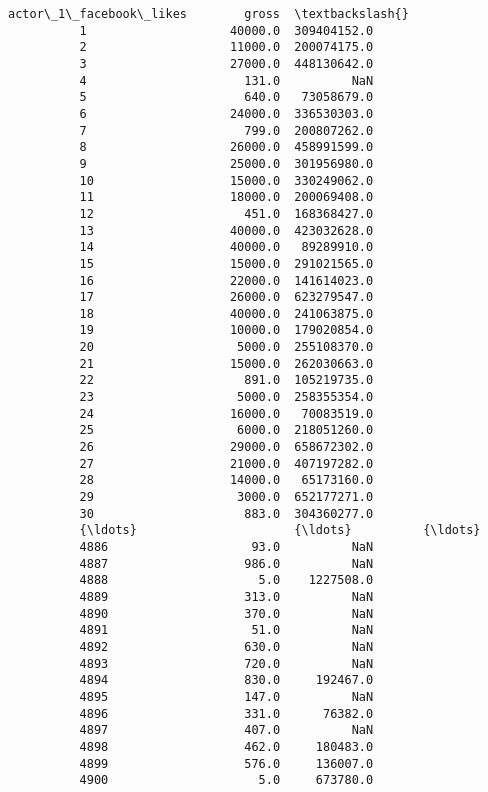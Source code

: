 \documentclass[11pt]{article}
\begin{document}
\begin{Verbatim}[commandchars=\\\{\}]
                actor\_1\_facebook\_likes        gross  \textbackslash{}
          1                    40000.0  309404152.0   
          2                    11000.0  200074175.0   
          3                    27000.0  448130642.0   
          4                      131.0          NaN   
          5                      640.0   73058679.0   
          6                    24000.0  336530303.0   
          7                      799.0  200807262.0   
          8                    26000.0  458991599.0   
          9                    25000.0  301956980.0   
          10                   15000.0  330249062.0   
          11                   18000.0  200069408.0   
          12                     451.0  168368427.0   
          13                   40000.0  423032628.0   
          14                   40000.0   89289910.0   
          15                   15000.0  291021565.0   
          16                   22000.0  141614023.0   
          17                   26000.0  623279547.0   
          18                   40000.0  241063875.0   
          19                   10000.0  179020854.0   
          20                    5000.0  255108370.0   
          21                   15000.0  262030663.0   
          22                     891.0  105219735.0   
          23                    5000.0  258355354.0   
          24                   16000.0   70083519.0   
          25                    6000.0  218051260.0   
          26                   29000.0  658672302.0   
          27                   21000.0  407197282.0   
          28                   14000.0   65173160.0   
          29                    3000.0  652177271.0   
          30                     883.0  304360277.0   
          {\ldots}                      {\ldots}          {\ldots}   
          4886                    93.0          NaN   
          4887                   986.0          NaN   
          4888                     5.0    1227508.0   
          4889                   313.0          NaN   
          4890                   370.0          NaN   
          4891                    51.0          NaN   
          4892                   630.0          NaN   
          4893                   720.0          NaN   
          4894                   830.0     192467.0   
          4895                   147.0          NaN   
          4896                   331.0      76382.0   
          4897                   407.0          NaN   
          4898                   462.0     180483.0   
          4899                   576.0     136007.0   
          4900                     5.0     673780.0   

\end{Verbatim}
\end{document}
